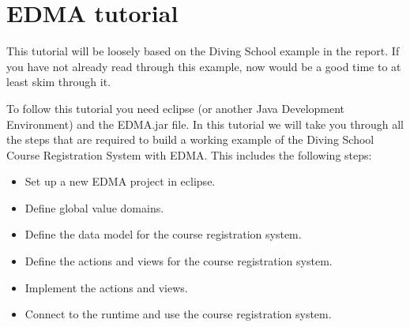 \appendix

\section{\label{sec:EDMAtutorial}EDMA tutorial}

This tutorial will be loosely based on the Diving School example in
the report. If you have not already read through this example, now
would be a good time to at least skim through it.

To follow this tutorial you need eclipse (or another Java Development
Environment) and the EDMA.jar file. In this tutorial we will take
you through all the steps that are required to build a working example
of the Diving School Course Registration System with EDMA. This includes
the following steps:
\begin{itemize}
\item Set up a new EDMA project in eclipse.
\item Define global value domains.
\item Define the data model for the course registration system.
\item Define the actions and views for the course registration system.
\item Implement the actions and views.
\item Connect to the runtime and use the course registration system.
\end{itemize}

